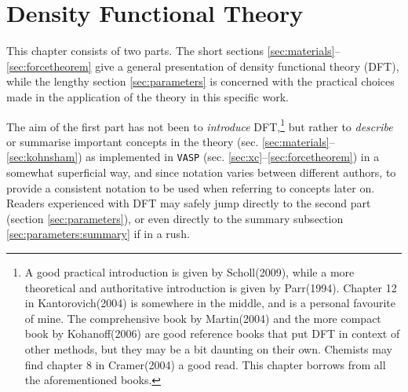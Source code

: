 \documentclass[11pt,bibliography=totoc,index=totoc]{scrbook}   %
\newcommand{\comment}[1]{\hl{#1}}
\newcommand{\vasp}{{\texttt{VASP}}} %
\begin{document}




%
\chapter{Density Functional Theory}\label{cha:DFT}
%

This chapter consists of two parts. The short sections \ref{sec:materials}--\ref{sec:forcetheorem} give a general presentation of density functional theory (DFT), 
while the lengthy section \ref{sec:parameters} is concerned with the practical choices made in the application of the theory in this specific work.

The aim of the first part has not been to \emph{introduce} DFT,\footnote{
A good practical introduction is given by Scholl(2009)\cite{Scholl:2009}, while a more theoretical and authoritative introduction is given by Parr(1994)\cite{Parr:1994}.
Chapter 12 in Kantorovich(2004)\cite{Kantorovich:2004} is somewhere in the middle, and is a personal favourite of mine.
The comprehensive book by Martin(2004)\cite{Martin:2004} and the more compact book by Kohanoff(2006)\cite{Kohanoff:2006} are good reference books that put DFT in context of other methods, 
but they may be a bit daunting on their own.
Chemists may find chapter 8 in Cramer(2004)\cite{Cramer:2004} a good read.
This chapter borrows from all the aforementioned books.
}
but rather to \emph{describe} or summarise important concepts in the theory (sec. \ref{sec:materials}--\ref{sec:kohnsham}) as implemented in {\vasp} (sec. \ref{sec:xc}--\ref{sec:forcetheorem}) in a somewhat superficial way, 
and since notation varies between different authors, to provide a consistent notation to be used when referring to concepts later on. 
Readers experienced with DFT may safely jump directly to the second part (section \ref{sec:parameters}),
or even directly to the summary subsection \ref{sec:parameters:summary} if in a rush. 
\end{document}

